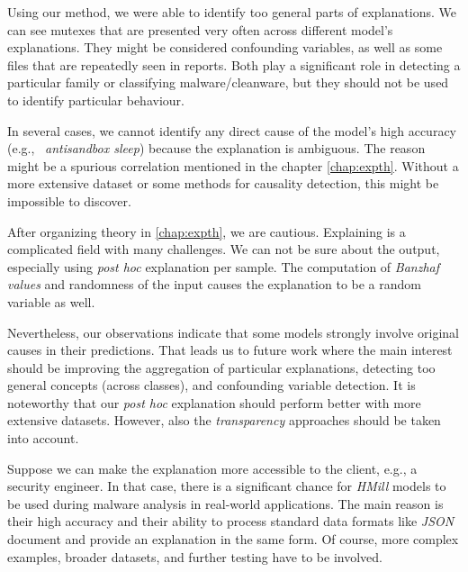 Using our method, we were able to identify too general parts of explanations. We can see mutexes that are presented very often across different model's explanations. They might be considered confounding variables, as well as some files that are repeatedly seen in reports. Both play a significant role in detecting a particular family or classifying malware/cleanware, but they should not be used to identify particular behaviour.

In several cases, we cannot identify any direct cause of the model's high accuracy (e.g., \ \emph{antisandbox sleep}) because the explanation is ambiguous. The reason might be a spurious correlation mentioned in the chapter \ref{chap:expth}. Without a more extensive dataset or some methods for causality detection, this might be impossible to discover.

\hfill \break

After organizing theory in \ref{chap:expth}, we are cautious. Explaining is a complicated field with many challenges. We can not be sure about the output, especially using \emph{post hoc} explanation per sample. The computation of \emph{Banzhaf values} and randomness of the input causes the explanation to be a random variable as well. 

Nevertheless, our observations indicate that some models strongly involve original causes in their predictions. That leads us to future work where the main interest should be improving the aggregation of particular explanations, detecting too general concepts (across classes), and confounding variable detection. It is noteworthy that our \emph{post hoc} explanation should perform better with more extensive datasets. However, also the \emph{transparency} approaches should be taken into account. 

Suppose we can make the explanation more accessible to the client, e.g., a security engineer. In that case, there is a significant chance for \emph{HMill} models to be used during malware analysis in real-world applications. The main reason is their high accuracy and their ability to process standard data formats like \emph{JSON} document and provide an explanation in the same form. Of course, more complex examples, broader datasets, and further testing have to be involved.

